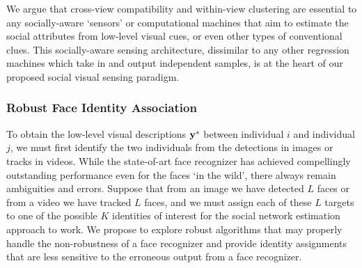 

We argue that cross-view compatibility and within-view clustering are essential to any socially-aware `sensors' or computational machines that aim to estimate the social attributes from low-level visual cues, or even other types of conventional clues. This socially-aware sensing architecture, dissimilar to any other regression machines which take in and output independent samples, is at the heart of our proposed social visual sensing paradigm.




\subsubsection{Robust Face Identity Association}
\label{sec:assoc}

To obtain the low-level visual descriptions ${\bf y}^s$ between individual $i$ and individual $j$, we must first identify the two individuals from the detections in images or tracks in videos. While the state-of-art face recognizer has achieved compellingly outstanding performance even for the faces `in the wild', there always remain ambiguities and errors. Suppose that from an image we have detected $L$ faces or from a video we have tracked $L$ faces, and we must assign each of these $L$ targets to one of the possible $K$ identities of interest for the social network estimation approach to work. We propose to explore robust algorithms that may properly handle the non-robustness of a face recognizer and provide identity assignments that are less sensitive to the erroneous output from a face recognizer.

